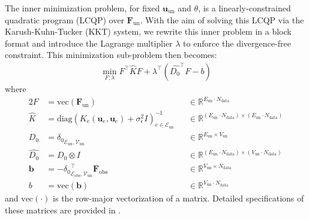 \documentclass{article}
\theoremstyle{definition}
\theoremstyle{remark}
\begin{document}
The inner minimization problem, for fixed $\mathbf{u}_\text{un}$ and $\theta$, is a linearly-constrained quadratic program (LCQP) over $\mathbf{F}_\text{un}$. With the aim of solving this LCQP via the Karush-Kuhn-Tucker (KKT) system, we rewrite this inner problem in a block format and introduce the Lagrange multiplier $\lambda$ to enforce the divergence-free constraint. This minimization sub-problem then becomes:
\begin{equation} \begin{split}
	\min_{F; \lambda} F^\intercal \widehat{K} F + \lambda^\intercal (\widehat{D_0}^\intercal F - b)
\end{split} \label{prob:lcqp} \end{equation}
where
\begin{alignat}{2}\label{eq:matrices}
	F &= \text{vec}(\mathbf{F}_\text{un}) &&\in \mathbb{R}^{ E_{\text{un}}\cdot  N_\text{data}} \\
	\widehat{K} &= \text{diag}(K_e( \mathbf{u}_e,  \mathbf{u}_e) + \sigma_{\epsilon}^2 I)_{e\in\mathcal{E}_{\text{un}}}^{-1} &&\in \mathbb{R}^{( E_{\text{un}}\cdot N_{\text{data}}) \times (E_\text{un}\cdot N_\text{data}) }\\
	D_0 &= {\delta_0}_{\mathcal{E}_\text{un}, \mathcal{V}_\text{un}} &&\in \mathbb{R}^{E_{\text{un}}\times V_\text{un}} \\
	\widehat{D_0} &= D_0 \otimes I &&\in \mathbb{R}^{(E_\text{un}\cdot N_\text{data})\times (V_\text{un}\cdot N_\text{data})}\\
	\mathbf{b} &= - {\delta_0}_{\mathcal{E}_\text{obs}, \mathcal{V}_\text{un}}^\intercal \mathbf{F}_\text{obs}  &&\in \mathbb{R}^{ V_\text{un}\times N_\text{data}}\\
	b &= \text{vec}( \mathbf{b} ) &&\in \mathbb{R}^{V_\text{un} \cdot N_\text{data} } 
\end{alignat}
and $\text{vec}(\cdot)$ is the row-major vectorization of a matrix. Detailed specifications of these matrices are provided in .
\end{document}
